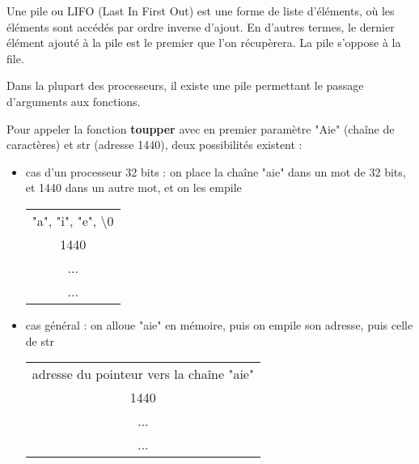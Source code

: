 \documentclass[11pt,a4paper]{article}
\begin{document}
\bigskip

\noindent Une pile ou LIFO (Last In First Out) est une forme de liste d'éléments, où les éléments sont accédés par ordre inverse d'ajout.
En d'autres termes, le dernier élément ajouté à la pile est le premier que l'on récupèrera.
La pile s'oppose à la file.

\medskip

\noindent Dans la plupart des processeurs, il existe une pile permettant le passage d'arguments aux fonctions.

\bigskip

\noindent Pour appeler la fonction \textbf{toupper} avec en premier paramètre "Aie" (chaîne de caractères) et str (adresse 1440), deux possibilités existent :
\begin{itemize}
\item cas d'un processeur 32 bits : on place la chaîne "aie" dans un mot de 32 bits, et 1440 dans un autre mot, et on les empile \\

\begin{tabular}{| c |}
\hline
 \\ \hline
"a", "i", "e", \textbackslash 0 \\ \hline
1440 \\ \hline
... \\ \hline
... \\ \hline
\end{tabular}

\item cas général : on alloue "aie" en mémoire, puis on empile son adresse, puis celle de str \\

\begin{tabular}{| c |}
\hline
 \\ \hline
adresse du pointeur vers la chaîne "aie" \\ \hline
1440 \\ \hline
... \\ \hline
... \\ \hline
\end{tabular}

\end{itemize}
\end{document}

